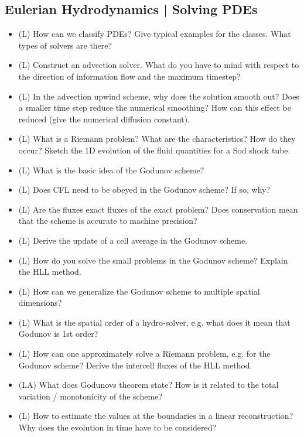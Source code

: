 \subsection*{Eulerian Hydrodynamics | Solving PDEs}

\begin{itemize}
    \item (L) How can we classify PDEs? Give typical examples for the classes. What types of solvers are there?
    \answerboxL
    \item (L) Construct an advection solver. What do you have to mind with respect to the 
    direction of information flow and the maximum timestep?
    \answerboxL
    \item (L) In the advection upwind scheme, why does the solution smooth out? Does a smaller
    time step reduce the numerical smoothing? How can this effect be reduced (give the numerical 
    diffusion constant).
    \answerboxL
    \item (L) What is a Riemann problem? What are the characteristics? How do they occur? Sketch the 1D evolution of the fluid quantities for a Sod shock tube.
    \answerboxL
    \item (L) What is the basic idea of the Godunov scheme?
    \answerboxM
    \item (L) Does CFL need to be obeyed in the Godunov scheme? If so, why?
    \answerboxS
    \item (L) Are the fluxes exact fluxes of the exact problem? Does conservation mean that the scheme is accurate to machine precision?
    \answerboxS
    \item (L) Derive the update of a cell average in the Godunov scheme.
    \answerboxL
    \item (L) How do you solve the small problems in the Godunov scheme? Explain the HLL method.
    \answerboxL
    \item (L) How can we generalize the Godunov scheme to multiple spatial dimensions?
    \answerboxL
    \item (L) What is the spatial order of a hydro-solver, e.g. what does it mean that Godunov is 1st order?
    \answerboxM
    \item (L) How can one approximately solve a Riemann problem, e.g. for the Godunov scheme? Derive the intercell fluxes of the HLL method.
    \answerboxL
    \item (LA) What does Godunovs theorem state? How is it related to the total variation / monotonicity of the scheme?
    \answerboxM
    \item (L) How to estimate the values at the boundaries in a linear reconstruction? Why does the evolution in time have to be considered?

\end{itemize}
